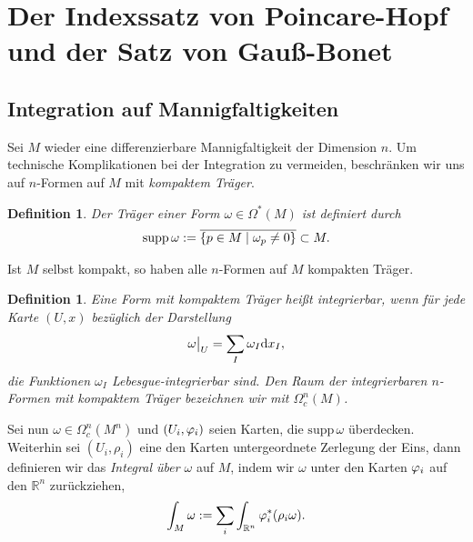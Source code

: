 \documentclass[12pt,a4paper]{article}
\def\R{\mathbb{R}}
\def\supp{\mathrm{supp}\,}
\newtheorem{Definition}[Lemma]{Definition}
\begin{document}
\clearpage



\section{Der Indexssatz von Poincare-Hopf und der Satz von Gau\ss{}-Bonet}

\newcommand{\ind}{\mathrm{ind}}
\newcommand{\Hess}{\mathrm{Hess}}
\newcommand{\dvol}{\mathrm{d}vol}
\newcommand{\NN}{\mathcal{N}}

\subsection{Integration auf Mannigfaltigkeiten}

Sei $M$ wieder eine differenzierbare Mannigfaltigkeit der Dimension $n$.
Um technische Komplikationen bei der Integration zu vermeiden, beschr\"anken wir
uns auf $n$-Formen auf $M$ mit \emph{kompaktem Tr\"ager}.

\begin{Definition}
Der Tr\"ager einer Form $\omega\in\Omega^*(M)$ ist definiert durch
\begin{align*}
\mathrm{supp}\, \omega := \overline{\left\{p\in M\;|\; \omega_p\neq 0\right\}}\subset M.
\end{align*}
\end{Definition}
\medskip
Ist $M$ selbst kompakt, so haben alle $n$-Formen auf $M$ kompakten
Tr\"ager.
\medskip
\begin{Definition}
Eine Form mit kompaktem Tr\"ager hei\ss{}t \emph{integrierbar}, wenn f\"ur
jede Karte $(U,x)$ bez\"uglich der Darstellung
\begin{align*}
\omega\big|_U = \sum_I \omega_I \mathrm{d}x_I,
\end{align*} 
die Funktionen $\omega_I$ Lebesgue-integrierbar sind. Den Raum der
integrierbaren $n$-Formen mit kompaktem Tr\"ager bezeichnen wir mit
$\Omega_c^n(M)$.
\end{Definition}
 
Sei nun $\omega\in\Omega_c^n(M^n)$ und $(U_i,\varphi_i)$ seien Karten, die $\supp
\omega$ \"uberdecken. Weiterhin sei $(U_i,\rho_i)$ eine den Karten
untergeordnete Zerlegung der Eins, dann definieren wir das \emph{Integral \"uber
$\omega$} auf $M$, indem wir $\omega$ unter den Karten $\varphi_i$ auf den $\R^n$
zur\"uckziehen,
\begin{align*}
\int_M \omega := \sum_i \int_{\R^n} \ph_i^*(\rho_i\omega).
\end{align*}
\end{document}
